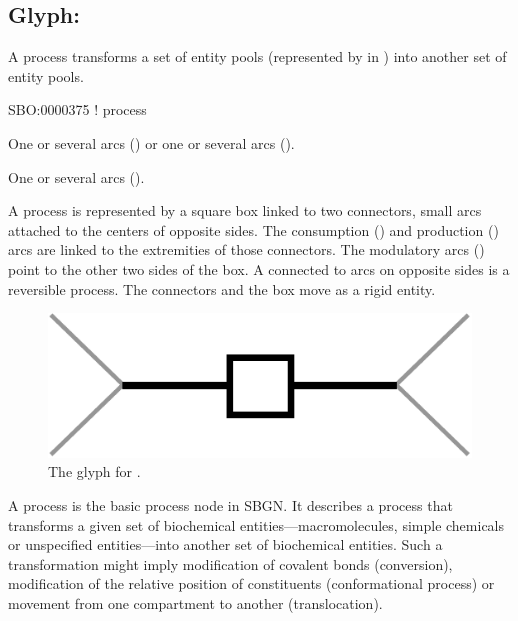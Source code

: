 

\subsection{Glyph: }
\label{sec:process}

A process transforms a set of entity pools (represented by  in \SBGNPDLone) into another set of entity pools.

\begin{glyphDescription}

\glyphSboTerm SBO:0000375 ! process

\glyphOrigin One or several  arcs () or one or several  arcs ().

\glyphTarget One or several  arcs ().

\glyphNode A process is represented by a square box linked to two connectors, small arcs attached to the centers of opposite sides. The consumption () and production () arcs are linked to the extremities of those connectors. The modulatory arcs () point to the other two sides of the box. A  connected to  arcs on opposite sides is a reversible process. The connectors and the box move as a rigid entity.

\end{glyphDescription}

\begin{figure}[H]
  \centering
  \includegraphics[scale = 0.4]{images/process}
  \caption{The \PD glyph for .}
  \label{fig:process}
\end{figure}

A process is the basic process node in SBGN.  It describes a process that transforms a given set of biochemical entities---macromolecules, simple chemicals or unspecified entities---into another set of biochemical entities.  Such a transformation might imply modification of covalent bonds (conversion), modification of the relative position of constituents (conformational process) or movement from one compartment to another (translocation).


